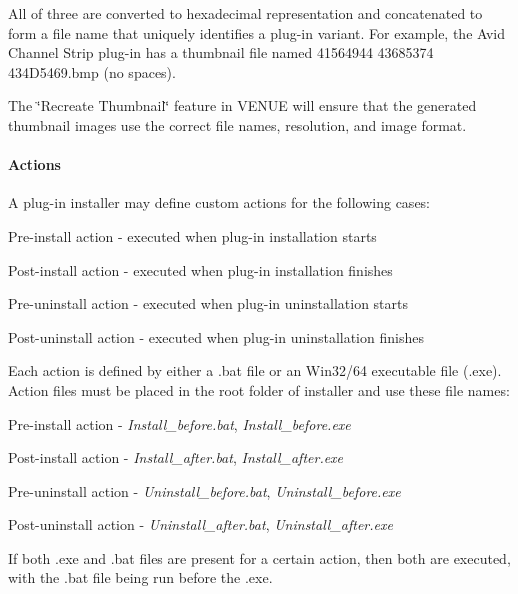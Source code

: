  All of three are converted to hexadecimal representation and concatenated to form a file name that uniquely identifies a plug-\/in variant. For example, the Avid Channel Strip plug-\/in has a thumbnail file named 41564944 43685374 434D5469.bmp (no spaces).

 The \char`\"{}\+Recreate Thumbnail\char`\"{} feature in V\+E\+N\+UE will ensure that the generated thumbnail images use the correct file names, resolution, and image format.

\hypertarget{a00849_subsubsection__aax_venue_guide__installer__optional_files__actions}{}\paragraph{Actions}\label{a00849_subsubsection__aax_venue_guide__installer__optional_files__actions}
 A plug-\/in installer may define custom actions for the following cases\+: 
\begin{DoxyEnumerate}
\item Pre-\/install action -\/ executed when plug-\/in installation starts 
\item Post-\/install action -\/ executed when plug-\/in installation finishes 
\item Pre-\/uninstall action -\/ executed when plug-\/in uninstallation starts 
\item Post-\/uninstall action -\/ executed when plug-\/in uninstallation finishes 
\end{DoxyEnumerate}

 Each action is defined by either a .bat file or an Win32/64 executable file (.exe). Action files must be placed in the root folder of installer and use these file names\+: 
\begin{DoxyEnumerate}
\item Pre-\/install action -\/ {\itshape Install\+\_\+before.\+bat}, {\itshape Install\+\_\+before.\+exe} 
\item Post-\/install action -\/ {\itshape Install\+\_\+after.\+bat}, {\itshape Install\+\_\+after.\+exe} 
\item Pre-\/uninstall action -\/ {\itshape Uninstall\+\_\+before.\+bat}, {\itshape Uninstall\+\_\+before.\+exe} 
\item Post-\/uninstall action -\/ {\itshape Uninstall\+\_\+after.\+bat}, {\itshape Uninstall\+\_\+after.\+exe} 
\end{DoxyEnumerate}

 If both .exe and .bat files are present for a certain action, then both are executed, with the .bat file being run before the .exe.

